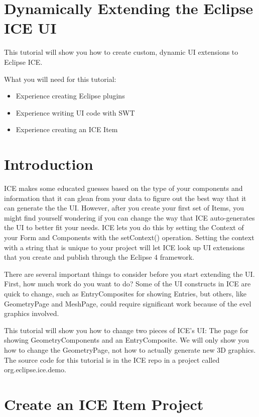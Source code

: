 \section*{Dynamically Extending the Eclipse ICE UI}

This tutorial will show you how to create custom, dynamic UI extensions to
Eclipse ICE.

What you will need for this tutorial:
\begin{itemize}
\item Experience creating Eclipse plugins
\item Experience writing UI code with SWT
\item Experience creating an ICE Item
\end{itemize}

\section{Introduction}

ICE makes some educated guesses based on the type of your components and
information that it can glean from your data to figure out the best way that it
can generate the the UI. However, after you create your first set of Items, you
might find yourself wondering if you can change the way that ICE auto-generates
the UI to better fit your needs. ICE lets you do this by setting the Context of
your Form and Components with the setContext() operation. Setting the context
with a string that is unique to your project will let ICE look up UI extensions
that you create and publish through the Eclipse 4 framework.

There are several important things to consider before you start extending the
UI. First, how much work do you want to do? Some of the UI constructs in ICE
are quick to change, such as EntryComposites for showing Entries, but others,
like GeometryPage and MeshPage, could require significant work because of the
evel graphics involved.

This tutorial will show you how to change two pieces of ICE’s UI: The page for
showing GeometryComponents and an EntryComposite. We will only show you how to
change the GeometryPage, not how to actually generate new 3D graphics. The
source code for this tutorial is in the ICE repo in a project called
org.eclipse.ice.demo.

\section{Create an ICE Item Project}

